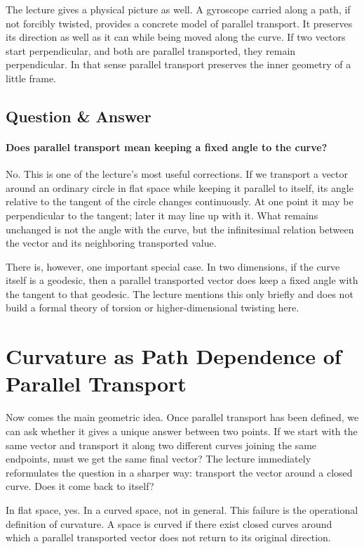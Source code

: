 The lecture gives a physical picture as well. A gyroscope carried along a path, if not forcibly twisted, provides a concrete model of parallel transport. It preserves its direction as well as it can while being moved along the curve. If two vectors start perpendicular, and both are parallel transported, they remain perpendicular. In that sense parallel transport preserves the inner geometry of a little frame.

\subsection{Question \& Answer}

\paragraph{Does parallel transport mean keeping a fixed angle to the curve?}

No. This is one of the lecture's most useful corrections. If we transport a vector around an ordinary circle in flat space while keeping it parallel to itself, its angle relative to the tangent of the circle changes continuously. At one point it may be perpendicular to the tangent; later it may line up with it. What remains unchanged is not the angle with the curve, but the infinitesimal relation between the vector and its neighboring transported value.

There is, however, one important special case. In two dimensions, if the curve itself is a geodesic, then a parallel transported vector does keep a fixed angle with the tangent to that geodesic. The lecture mentions this only briefly and does not build a formal theory of torsion or higher-dimensional twisting here.

\section{Curvature as Path Dependence of Parallel Transport}

Now comes the main geometric idea. Once parallel transport has been defined, we can ask whether it gives a unique answer between two points. If we start with the same vector and transport it along two different curves joining the same endpoints, must we get the same final vector? The lecture immediately reformulates the question in a sharper way: transport the vector around a closed curve. Does it come back to itself?

In flat space, yes. In a curved space, not in general. This failure is the operational definition of curvature. A space is curved if there exist closed curves around which a parallel transported vector does not return to its original direction.

